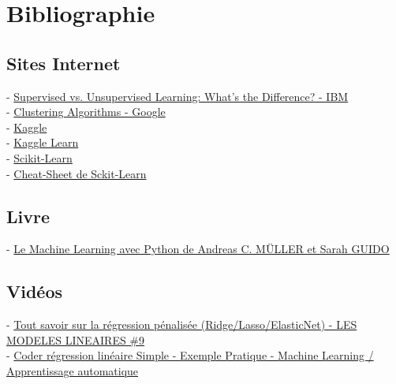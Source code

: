 \chapter{Bibliographie}

\section{Sites Internet}

 - \href{https://www.ibm.com/cloud/blog/supervised-vs-unsupervised-learning}{Supervised vs. Unsupervised Learning: What’s the Difference? - IBM}\\

 - \href{https://developers.google.com/machine-learning/clustering/clustering-algorithms?hl=en}{Clustering Algorithms - Google}\\

 - \href{https://www.kaggle.com/competitions}{Kaggle}\\

 - \href{https://www.kaggle.com/learn}{Kaggle Learn}\\

 - \href{https://scikit-learn.org/stable/index.html}{Scikit-Learn}\\

 - \href{https://scikit-learn.org/stable/tutorial/machine_learning_map/index.html}{Cheat-Sheet de Sckit-Learn}


\section{Livre}
 - \href{https://www.oreilly.com/library/view/le-machine-learning/9782412034460/}{Le Machine Learning avec Python de Andreas C. MÜLLER et Sarah GUIDO}

\section{Vidéos}

 - \href{https://www.youtube.com/watch?v=YfAgP-xKi30&list=LL&index=2}{Tout savoir sur la régression pénalisée (Ridge/Lasso/ElasticNet) - LES MODELES LINEAIRES \#9 }\\

 - \href{https://www.youtube.com/watch?v=WLmOFlSxYTY&list=LL&index=25}{ Coder régression linéaire Simple - Exemple Pratique - Machine Learning / Apprentissage automatique }


